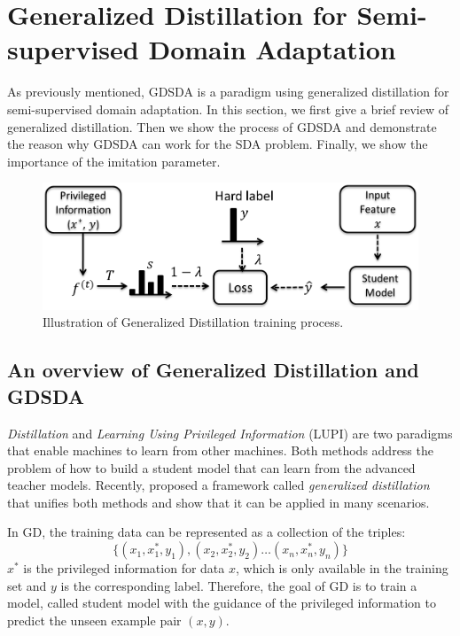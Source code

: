 \section{Generalized Distillation for Semi-supervised Domain Adaptation}\label{sec:aaai:gdda}
As previously mentioned, GDSDA is a paradigm using generalized distillation for semi-supervised domain adaptation. In this section, we first give a brief review of generalized distillation. Then we show the process of GDSDA and demonstrate the reason why GDSDA can work for the SDA problem. Finally, we show the importance of the imitation parameter. 
\begin{figure}\label{fig:gd}
	\centering
	\includegraphics[scale=.6]{aaai/figure/GD.png}
	\caption{Illustration of Generalized Distillation training process.}
\end{figure}
\subsection{An overview of Generalized Distillation and GDSDA}
\textit{Distillation} \cite{hinton2015distilling} and \textit{Learning Using Privileged Information} (LUPI) \cite{vapnik2015learning} are two paradigms that enable machines to learn from other machines. Both methods address the problem of how to build a student model that can learn from the advanced teacher models. Recently, \cite{lopez2015unifying} proposed a framework called \textit{generalized distillation} that unifies both methods and show that it can be applied in many scenarios.

In GD, the training data can be represented as a collection of the triples:
\[\{\left(x_1,x_1^*,y_1\right),\left(x_2,x_2^*,y_2\right) \dots \left(x_n,x_n^*,y_n\right)\}\]
$x^*$ is the privileged information for data $x$, which is only available in the training set and $y$ is the corresponding label. Therefore, the goal of GD is to train a model, called student model with the guidance of the privileged information to predict the unseen example pair $(x,y)$.

